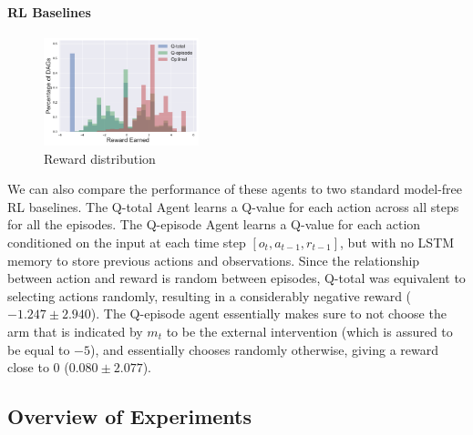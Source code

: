 \paragraph{RL Baselines}

 \begin{figure}
 \centering
 \includegraphics[width=0.4\textwidth]{figures/reward_dist.pdf} 
 \caption{Reward distribution}
 \label{fig:rewarddist}
 \end{figure}

We can also compare the performance of these agents to two standard model-free RL baselines. The Q-total Agent learns a Q-value for each action across all steps for all the episodes. The Q-episode Agent learns a Q-value for each action conditioned on the input at each time step $[o_t, a_{t-1}, r_{t-1}]$, but with no LSTM memory to store previous actions and observations. Since the relationship between action and reward is random between episodes, Q-total was equivalent to selecting actions randomly, resulting in a considerably negative reward ($-1.247 \pm
2.940$). The Q-episode agent essentially makes sure to not choose the arm that is indicated by $m_t$ to be the external intervention (which is assured to be equal to $-5$), and essentially chooses randomly otherwise, giving a reward close to 0 ($0.080 \pm 2.077$).



\subsection{Overview of Experiments}

